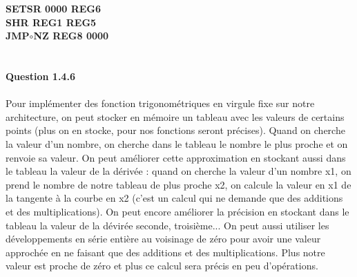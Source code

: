\documentclass[a4paper,11pt]{article}
\begin{document}
\textbf{SETSR 0000 REG6}\\
\textbf{SHR REG1 REG5}\\
\textbf{JMP$\circ$NZ REG8 0000}\\
\\
\\
\textbf{Question 1.4.6}\\
\\
Pour implémenter des fonction trigonométriques en virgule fixe sur notre architecture, on peut stocker en mémoire un tableau avec les valeurs de certains points (plus on en stocke, pour nos fonctions seront précises). Quand on cherche la valeur d'un nombre, on cherche dans le tableau le nombre le plus proche et on renvoie sa valeur. On peut améliorer cette approximation en stockant aussi dans le tableau la valeur de la dérivée : quand on cherche la valeur d'un nombre x1, on prend le nombre de notre tableau de plus proche x2, on calcule la valeur en x1 de la tangente à la courbe en x2 (c'est un calcul qui ne demande que des additions et des multiplications). On peut encore améliorer la précision en stockant dans le tableau la valeur de la dévirée seconde, troisième...
On peut aussi utiliser les développements en série entière au voisinage de zéro pour avoir une valeur approchée en ne faisant que des additions et des multiplications. Plus notre valeur est proche de zéro et plus ce calcul sera précis en peu d'opérations.
 
 
\end{document}
